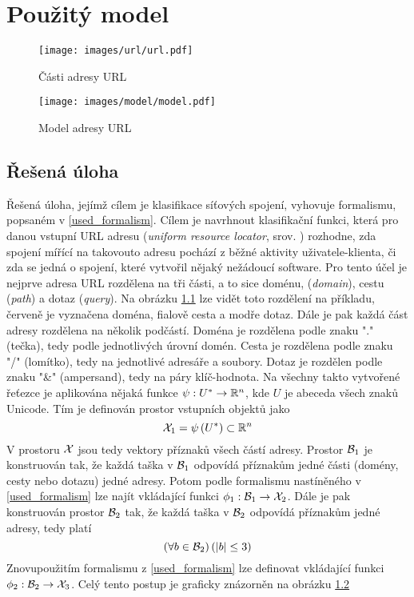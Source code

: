 \chapter{Použitý model}

\begin{figure}
	\caption{Části adresy URL}\label{url_parts}
	\centering
	\texttt{[image: images/url/url.pdf]}
\end{figure}

\begin{figure}
	\caption{Model adresy URL}\label{url_model}
	\centering
	\texttt{[image: images/model/model.pdf]}
\end{figure}

\section{Řešená úloha}
Řešená úloha, jejímž cílem je klasifikace síťových spojení, vyhovuje formalismu, popsaném v \ref{used_formalism}. Cílem je navrhnout klasifikační funkci, která pro danou vstupní URL adresu (\textit{\textenglish{uniform resource locator}}, srov. \cite{berners-lee_uniform_1994}) rozhodne, zda spojení mířící na takovouto adresu pochází z běžné aktivity uživatele-klienta, či zda se jedná o spojení, které vytvořil nějaký nežádoucí software. Pro tento účel je nejprve adresa URL rozdělena na tři části, a to sice doménu, (\textit{\textenglish{domain}}), cestu (\textit{\textenglish{path}}) a dotaz (\textit{\textenglish{query}}). Na obrázku \ref{url_parts} lze vidět toto rozdělení na příkladu, červeně je vyznačena doména, fialově cesta a modře dotaz. Dále je pak každá část adresy rozdělena na několik podčástí. Doména je rozdělena podle znaku "." (tečka), tedy podle jednotlivých úrovní domén. Cesta je rozdělena podle znaku "/" (lomítko), tedy na jednotlivé adresáře a soubory. Dotaz je rozdělen podle znaku "\&" (ampersand), tedy na páry klíč-hodnota. Na všechny takto vytvořené řeťezce je aplikována nějaká funkce \( \psi : U^* \to \mathbb R^n \), kde \( U \) je abeceda všech znaků Unicode. Tím je definován prostor vstupních objektů jako
\begin{equation}
	\mathcal X_1 = \psi \left( U^* \right) \subset \mathbb R^n
\end{equation}
V prostoru \( \mathcal X \) jsou tedy vektory příznaků všech částí adresy. Prostor \( \mathcal B_1 \) je konstruován tak, že každá taška v \( \mathcal B_1 \) odpovídá příznakům jedné části (domény, cesty nebo dotazu) jedné adresy. Potom podle formalismu nastíněného v \ref{used_formalism} lze najít vkládající funkci \( \phi_1 : \mathcal B_1 \to \mathcal X_2 \). Dále je pak konstruován prostor \( \mathcal B_2 \) tak, že každá taška v \( \mathcal B_2 \) odpovídá příznakům jedné adresy, tedy platí
\begin{equation}
	\left( \forall b \in \mathcal B_2 \right) \left( \left| b \right| \leq 3 \right)
\end{equation}
Znovupoužitím formalismu z \ref{used_formalism} lze definovat vkládající funkci \( \phi_2 : \mathcal B_2 \to \mathcal X_3 \). Celý tento postup je graficky znázorněn na obrázku \ref{url_model}

